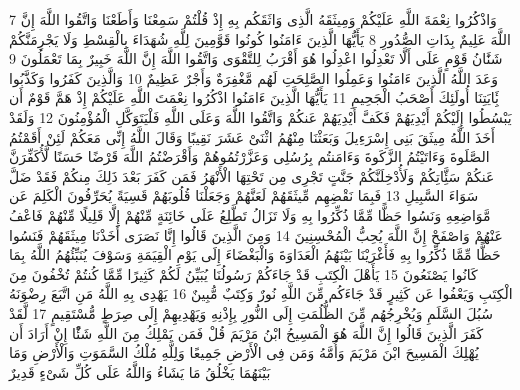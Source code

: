 \documentclass[20pt,a4paper]{article}
\begin{document}
{\tiny\colorbox{cl_aya}{7}} وَاذْكُرُوا نِعْمَةَ اللَّهِ عَلَيْكُمْ وَمِيثَقَهُ الَّذِى وَاثَقَكُم بِهِ إِذْ قُلْتُمْ سَمِعْنَا وَأَطَعْنَا وَاتَّقُوا اللَّهَ إِنَّ اللَّهَ عَلِيمٌ بِذَاتِ الصُّدُورِ
{\tiny\colorbox{cl_aya}{8}} يَأَيُّهَا الَّذِينَ ءَامَنُوا كُونُوا قَوَّمِينَ لِلَّهِ شُهَدَاءَ بِالْقِسْطِ وَلَا يَجْرِمَنَّكُمْ شَنََٔانُ قَوْمٍ عَلَى أَلَّا تَعْدِلُوا اعْدِلُوا هُوَ أَقْرَبُ لِلتَّقْوَى وَاتَّقُوا اللَّهَ إِنَّ اللَّهَ خَبِيرٌ بِمَا تَعْمَلُونَ
{\tiny\colorbox{cl_aya}{9}} وَعَدَ اللَّهُ الَّذِينَ ءَامَنُوا وَعَمِلُوا الصَّلِحَتِ لَهُم مَّغْفِرَةٌ وَأَجْرٌ عَظِيمٌ
{\tiny\colorbox{cl_aya}{10}} وَالَّذِينَ كَفَرُوا وَكَذَّبُوا بَِٔايَتِنَا أُولَئِكَ أَصْحَبُ الْجَحِيمِ
{\tiny\colorbox{cl_aya}{11}} يَأَيُّهَا الَّذِينَ ءَامَنُوا اذْكُرُوا نِعْمَتَ اللَّهِ عَلَيْكُمْ إِذْ هَمَّ قَوْمٌ أَن يَبْسُطُوا إِلَيْكُمْ أَيْدِيَهُمْ فَكَفَّ أَيْدِيَهُمْ عَنكُمْ وَاتَّقُوا اللَّهَ وَعَلَى اللَّهِ فَلْيَتَوَكَّلِ الْمُؤْمِنُونَ
{\tiny\colorbox{cl_aya}{12}} وَلَقَدْ أَخَذَ اللَّهُ مِيثَقَ بَنِى إِسْرَءِيلَ وَبَعَثْنَا مِنْهُمُ اثْنَىْ عَشَرَ نَقِيبًا وَقَالَ اللَّهُ إِنِّى مَعَكُمْ لَئِنْ أَقَمْتُمُ الصَّلَوةَ وَءَاتَيْتُمُ الزَّكَوةَ وَءَامَنتُم بِرُسُلِى وَعَزَّرْتُمُوهُمْ وَأَقْرَضْتُمُ اللَّهَ قَرْضًا حَسَنًا لَّأُكَفِّرَنَّ عَنكُمْ سَئَِّاتِكُمْ وَلَأُدْخِلَنَّكُمْ جَنَّتٍ تَجْرِى مِن تَحْتِهَا الْأَنْهَرُ فَمَن كَفَرَ بَعْدَ ذَلِكَ مِنكُمْ فَقَدْ ضَلَّ سَوَاءَ السَّبِيلِ
{\tiny\colorbox{cl_aya}{13}} فَبِمَا نَقْضِهِم مِّيثَقَهُمْ لَعَنَّهُمْ وَجَعَلْنَا قُلُوبَهُمْ قَسِيَةً يُحَرِّفُونَ الْكَلِمَ عَن مَّوَاضِعِهِ وَنَسُوا حَظًّا مِّمَّا ذُكِّرُوا بِهِ وَلَا تَزَالُ تَطَّلِعُ عَلَى خَائِنَةٍ مِّنْهُمْ إِلَّا قَلِيلًا مِّنْهُمْ فَاعْفُ عَنْهُمْ وَاصْفَحْ إِنَّ اللَّهَ يُحِبُّ الْمُحْسِنِينَ
{\tiny\colorbox{cl_aya}{14}} وَمِنَ الَّذِينَ قَالُوا إِنَّا نَصَرَى أَخَذْنَا مِيثَقَهُمْ فَنَسُوا حَظًّا مِّمَّا ذُكِّرُوا بِهِ فَأَغْرَيْنَا بَيْنَهُمُ الْعَدَاوَةَ وَالْبَغْضَاءَ إِلَى يَوْمِ الْقِيَمَةِ وَسَوْفَ يُنَبِّئُهُمُ اللَّهُ بِمَا كَانُوا يَصْنَعُونَ
{\tiny\colorbox{cl_aya}{15}} يَأَهْلَ الْكِتَبِ قَدْ جَاءَكُمْ رَسُولُنَا يُبَيِّنُ لَكُمْ كَثِيرًا مِّمَّا كُنتُمْ تُخْفُونَ مِنَ الْكِتَبِ وَيَعْفُوا عَن كَثِيرٍ قَدْ جَاءَكُم مِّنَ اللَّهِ نُورٌ وَكِتَبٌ مُّبِينٌ
{\tiny\colorbox{cl_aya}{16}} يَهْدِى بِهِ اللَّهُ مَنِ اتَّبَعَ رِضْوَنَهُ سُبُلَ السَّلَمِ وَيُخْرِجُهُم مِّنَ الظُّلُمَتِ إِلَى النُّورِ بِإِذْنِهِ وَيَهْدِيهِمْ إِلَى صِرَطٍ مُّسْتَقِيمٍ
{\tiny\colorbox{cl_aya}{17}} لَّقَدْ كَفَرَ الَّذِينَ قَالُوا إِنَّ اللَّهَ هُوَ الْمَسِيحُ ابْنُ مَرْيَمَ قُلْ فَمَن يَمْلِكُ مِنَ اللَّهِ شَئًْا إِنْ أَرَادَ أَن يُهْلِكَ الْمَسِيحَ ابْنَ مَرْيَمَ وَأُمَّهُ وَمَن فِى الْأَرْضِ جَمِيعًا وَلِلَّهِ مُلْكُ السَّمَوَتِ وَالْأَرْضِ وَمَا بَيْنَهُمَا يَخْلُقُ مَا يَشَاءُ وَاللَّهُ عَلَى كُلِّ شَىْءٍ قَدِيرٌ
\end{document}
